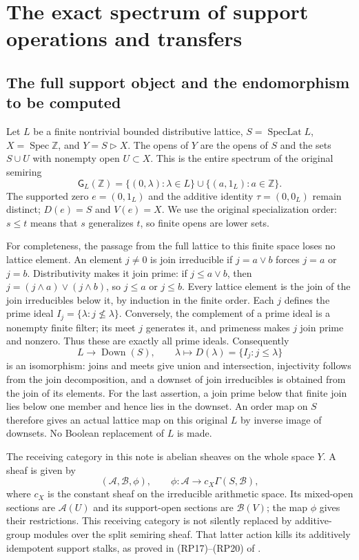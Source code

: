 \documentclass[11pt,a4paper]{article}
\theoremstyle{definition}\newtheorem{definition}[theorem]{Definition}
\newcommand{\Z}{\mathbb Z}\newcommand{\Q}{\mathbb Q}
\newcommand{\Spec}{\operatorname{Spec}}\newcommand{\SpecMon}{\operatorname{Spec}_{\mathrm{mon}}}
\newcommand{\G}{\mathsf G}\newcommand{\Tor}{\operatorname{Tor}}\newcommand{\Frac}{\operatorname{Frac}}
\providecommand{\Down}{\operatorname{Down}}
\begin{document}
\section{The exact spectrum of support operations and transfers}


\subsection{The full support object and the endomorphism to be computed}

Let $L$ be a finite nontrivial bounded distributive lattice,
$S=\operatorname{SpecLat}L$, $X=\Spec\Z$, and
$Y=S\triangleright X$. The opens of $Y$ are the opens of $S$ and
the sets $S\cup U$ with nonempty open $U\subset X$. This is the
entire spectrum of the original semiring
\[
 \G_L(\Z)=\{(0,\lambda):\lambda\in L\}
       \cup\{(a,1_L):a\in\Z\}.
 \tag{SE1}\label{eq:original-space}
\]
The supported zero $e=(0,1_L)$ and the additive identity
$\tau=(0,0_L)$ remain distinct; $D(e)=S$ and $V(e)=X$.
We use the original specialization order: $s\le t$ means that $s$
generalizes $t$, so finite opens are lower sets.

For completeness, the passage from the full lattice to this finite
space loses no lattice element. An element $j\ne0$ is join
irreducible if $j=a\vee b$ forces $j=a$ or $j=b$. Distributivity
makes it join prime: if $j\le a\vee b$, then
$j=(j\wedge a)\vee(j\wedge b)$, so $j\le a$ or $j\le b$.
Every lattice element is the join of the join irreducibles below
it, by induction in the finite order. Each $j$ defines the prime
ideal $I_j=\{\lambda:j\not\le\lambda\}$. Conversely, the complement
of a prime ideal is a nonempty finite filter; its meet $j$ generates
it, and primeness makes $j$ join prime and nonzero. Thus these are
exactly all prime ideals. Consequently
\[
 L\longrightarrow\Down(S),\qquad
 \lambda\longmapsto D(\lambda)=\{I_j:j\le\lambda\}
\]
is an isomorphism: joins and meets give union and intersection,
injectivity follows from the join decomposition, and a downset of
join irreducibles is obtained from the join of its elements.
For the last assertion, a join prime below that finite join lies
below one member and hence lies in the downset. An order map on
$S$ therefore gives an actual lattice map on this original $L$
by inverse image of downsets. No Boolean replacement of $L$ is made.

The receiving category in this note is abelian sheaves on the whole
space $Y$. A sheaf is given by
\[
 (\mathcal A,\mathcal B,\phi),\qquad
 \phi:\mathcal A\longrightarrow c_X\Gamma(S,\mathcal B),
 \tag{SE2}\label{eq:gluing}
\]
where $c_X$ is the constant sheaf on the irreducible arithmetic space.
Its mixed-open sections are $\mathcal A(U)$ and its support-open
sections are $\mathcal B(V)$; the map $\phi$ gives their restrictions.
This receiving category is not silently replaced by additive-group
modules over the split semiring sheaf. That latter action kills its
additively idempotent support stalks, as proved in (RP17)--(RP20) of
.
\end{document}
